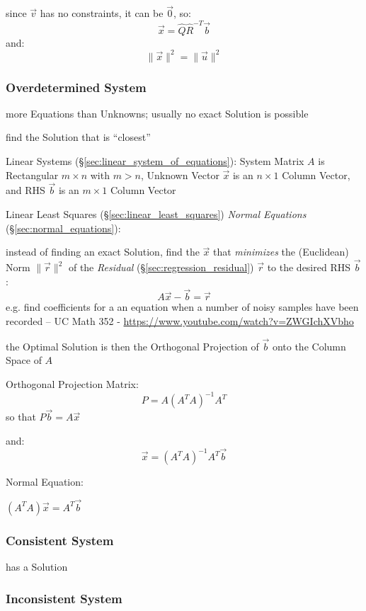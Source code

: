 since $\vec{v}$ has no constraints, it can be $\vec{0}$, so:
\[
  \vec{x} = \hat{Q}\hat{R}^{-T}\vec{b}
\]
and:
\[
  \|\vec{x}\|^2 = \|\vec{u}\|^2
\]



\subsubsection{Overdetermined System}\label{sec:overdetermined_system}

more Equations than Unknowns; usually no exact Solution is possible

find the Solution that is ``closest''

Linear Systems (\S\ref{sec:linear_system_of_equations}): System Matrix $A$ is
Rectangular $m \times n$ with $m > n$, Unknown Vector $\vec{x}$ is an $n \times
1$ Column Vector, and RHS $\vec{b}$ is an $m \times 1$ Column Vector

Linear Least Squares (\S\ref{sec:linear_least_squares}) \emph{Normal Equations}
(\S\ref{sec:normal_equations}):

instead of finding an exact Solution, find the $\vec{x}$ that \emph{minimizes}
the (Euclidean) Norm $\|\vec{r}\|^2$ of the \emph{Residual}
(\S\ref{sec:regression_residual}) $\vec{r}$ to the desired RHS $\vec{b}$:
\[
  A\vec{x} - \vec{b} = \vec{r}
\]
e.g. find coefficients for a an equation when a number of noisy samples have
been recorded -- UC Math 352 - \url{https://www.youtube.com/watch?v=ZWGIchXVbho}

the Optimal Solution is then the Orthogonal Projection of $\vec{b}$ onto the
Column Space of $A$

Orthogonal Projection Matrix:
\[
  P = A(A^TA)^{-1}A^T
\]
so that $P\vec{b} = A\vec{x}$

and:
\[
  \vec{x} = (A^TA)^{-1}A^T\vec{b}
\]

Normal Equation:

$(A^TA)\vec{x} = A^T\vec{b}$



\subsubsection{Consistent System}\label{sec:consistent_system}

has a Solution



\subsubsection{Inconsistent System}\label{sec:inconsistent_system}

